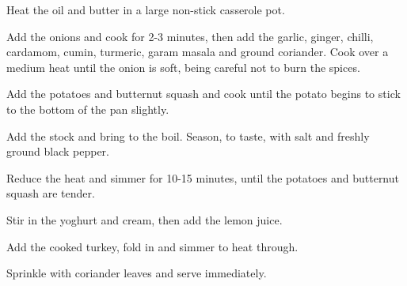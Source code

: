 
Heat the oil and butter in a large non-stick casserole pot.

Add the onions and cook for 2-3 minutes, then add the garlic, ginger, chilli, cardamom, cumin, turmeric, garam masala and ground coriander. Cook over a medium heat until the onion is soft, being careful not to burn the spices.

Add the potatoes and butternut squash and cook until the potato begins to stick to the bottom of the pan slightly.

Add the stock and bring to the boil. Season, to taste, with salt and freshly ground black pepper.

Reduce the heat and simmer for 10-15 minutes, until the potatoes and butternut squash are tender.

Stir in the yoghurt and cream, then add the lemon juice.

Add the cooked turkey, fold in and simmer to heat through.

Sprinkle with coriander leaves and serve immediately.
